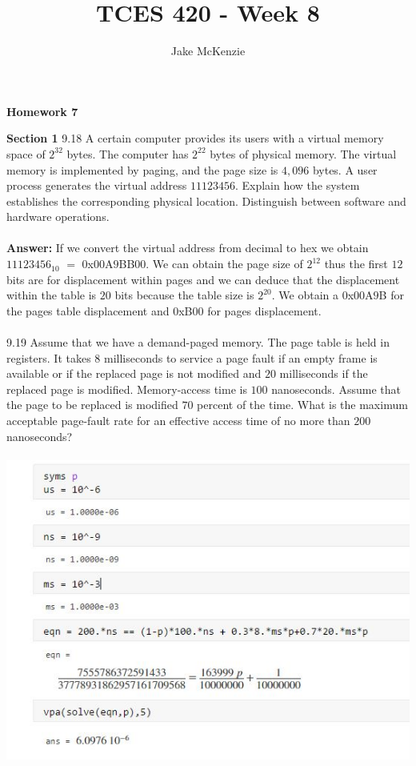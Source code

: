 \documentclass[12pt]{article}
\begin{document}
\title{TCES 420 - Week 8}
\author{Jake McKenzie}
\maketitle
\noindent\centerline{\textbf{Homework 7}}
\textbf{Section 1}
9.18 A certain computer provides its users with a virtual memory space of
$2^32$ bytes. The computer has $2^22$ bytes of physical memory. The virtual
memory is implemented by paging, and the page size is $4,096$ bytes.
A user process generates the virtual address $11123456$. Explain how
the system establishes the corresponding physical location. Distinguish
between software and hardware operations.\\\\
\textbf{Answer: } If we convert the virtual address from decimal to 
hex we obtain $11123456_{10}$ $=$ $0$x$00$A$9$BB$00$. We can obtain the 
page size of $2^12$ thus the first $12$ bits are for displacement within pages 
and we can deduce that the displacement within the table is $20$ bits 
because the table size is $2^20$. We obtain a $0$x$00$A$9$B for the pages 
table displacement and $0$xB$00$ for pages displacement.\\\\
9.19 Assume that we have a demand-paged memory. The page table is held in
registers. It takes 8 milliseconds to service a page fault if an empty frame
is available or if the replaced page is not modified and $20$ milliseconds if
the replaced page is modified. Memory-access time is $100$ nanoseconds.
Assume that the page to be replaced is modified $70$ percent of the
time. What is the maximum acceptable page-fault rate for an effective
access time of no more than $200$ nanoseconds?\\\\
\includegraphics[scale = 1]{q19.JPG}\\
\end{document}
